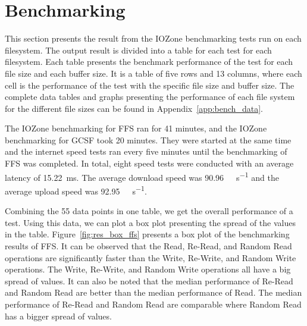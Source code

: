 \section{Benchmarking}
\label{sec:res_bench}
This section presents the result from the IOZone benchmarking tests run on each filesystem. The output result is divided into a table for each test for each filesystem. Each table presents the benchmark performance of the test for each file size and each buffer size. It is a table of five rows and 13 columns, where each cell is the performance of the test with the specific file size and buffer size. The complete data tables and graphs presenting the performance of each file system for the different file sizes can be found in Appendix~\ref{app:bench_data}.

The IOZone benchmarking for \gls{FFS} ran for 41 minutes, and the IOZone benchmarking for \gls{GCSF} took 20 minutes. They were started at the same time and the internet speed tests ran every five minutes until the benchmarking of \gls{FFS} was completed. In total, eight speed tests were conducted with an average latency of \SI{15.22}{\milli\second}. The average download speed was \SI[per-mode = symbol]{90.96}{\mega\bit\per\second} and the average upload speed was \SI[per-mode = symbol]{92.95}{\mega\bit\per\second}.

Combining the 55 data points in one table, we get the overall performance of a test. Using this data, we can plot a box plot presenting the spread of the values in the table. Figure~\ref{fig:res_box_ffs} presents a box plot of the benchmarking results of \gls{FFS}. It can be observed that the Read, Re-Read, and Random Read operations are significantly faster than the Write, Re-Write, and Random Write operations. The Write, Re-Write, and Random Write operations all have a big spread of values. It can also be noted that the median performance of Re-Read and Random Read are better than the median performance of Read. The median performance of Re-Read and Random Read are comparable where Random Read has a bigger spread of values.

